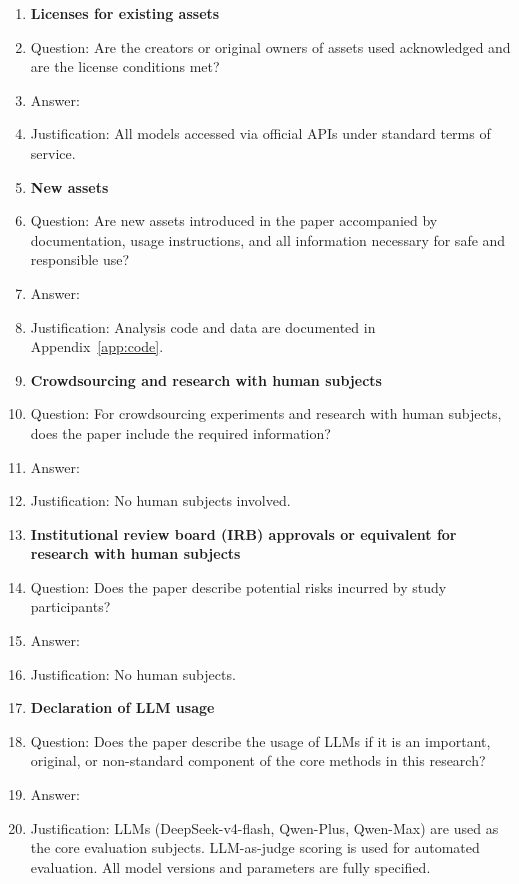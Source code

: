 \documentclass{article}
\begin{document}
\begin{enumerate}
\item {\bf Licenses for existing assets}
    \item[] Question: Are the creators or original owners of assets used acknowledged and are the license conditions met?
    \item[] Answer: \answerYes{}
    \item[] Justification: All models accessed via official APIs under standard terms of service.

\item {\bf New assets}
    \item[] Question: Are new assets introduced in the paper accompanied by documentation, usage instructions, and all information necessary for safe and responsible use?
    \item[] Answer: \answerYes{}
    \item[] Justification: Analysis code and data are documented in Appendix~\ref{app:code}.

\item {\bf Crowdsourcing and research with human subjects}
    \item[] Question: For crowdsourcing experiments and research with human subjects, does the paper include the required information?
    \item[] Answer: \answerNA{}
    \item[] Justification: No human subjects involved.

\item {\bf Institutional review board (IRB) approvals or equivalent for research with human subjects}
    \item[] Question: Does the paper describe potential risks incurred by study participants?
    \item[] Answer: \answerNA{}
    \item[] Justification: No human subjects.

\item {\bf Declaration of LLM usage}
    \item[] Question: Does the paper describe the usage of LLMs if it is an important, original, or non-standard component of the core methods in this research?
    \item[] Answer: \answerYes{}
    \item[] Justification: LLMs (DeepSeek-v4-flash, Qwen-Plus, Qwen-Max) are used as the core evaluation subjects. LLM-as-judge scoring is used for automated evaluation. All model versions and parameters are fully specified.

\end{enumerate}
\end{document}
